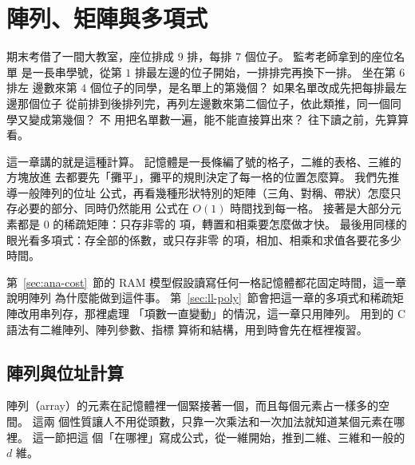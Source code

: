 \chapter{陣列、矩陣與多項式}
\label{ch:arrays}


期末考借了一間大教室，座位排成 $9$ 排，每排 $7$ 個位子。 監考老師拿到的座位名單
是一長串學號，從第 $1$ 排最左邊的位子開始，一排排完再換下一排。 坐在第 $6$ 排左
邊數來第 $4$ 個位子的同學，是名單上的第幾個？ 如果名單改成先把每排最左邊那個位子
從前排到後排列完，再列左邊數來第二個位子，依此類推，同一個同學又變成第幾個？ 不
用把名單數一遍，能不能直接算出來？ 往下讀之前，先算算看。

這一章講的就是這種計算。 記憶體是一長條編了號的格子，二維的表格、三維的方塊放進
去都要先「攤平」，攤平的規則決定了每一格的位置怎麼算。 我們先推導一般陣列的位址
公式，再看幾種形狀特別的矩陣（三角、對稱、帶狀）怎麼只存必要的部分、同時仍然能用
公式在 $O(1)$ 時間找到每一格。 接著是大部分元素都是 $0$ 的稀疏矩陣：只存非零的
項，轉置和相乘要怎麼做才快。 最後用同樣的眼光看多項式：存全部的係數，或只存非零
的項，相加、相乘和求值各要花多少時間。

第~\ref{sec:ana-cost}~節的 RAM 模型假設讀寫任何一格記憶體都花固定時間，這一章說明陣列
為什麼能做到這件事。 第~\ref{sec:ll-poly}~節會把這一章的多項式和稀疏矩陣改用串列存，那裡處理
「項數一直變動」的情況，這一章只用陣列。 用到的 C 語法有二維陣列、陣列參數、指標
算術和結構，用到時會先在框裡複習。

\section{陣列與位址計算}
\label{sec:arr-address}

陣列（array）的元素在記憶體裡一個緊接著一個，而且每個元素占一樣多的空間。 這兩
個性質讓人不用從頭數，只靠一次乘法和一次加法就知道某個元素在哪裡。 這一節把這
個「在哪裡」寫成公式，從一維開始，推到二維、三維和一般的 $d$ 維。

